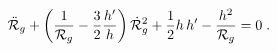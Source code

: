 \begin{equation}\label{geo}
\ddot {\cal R}_g + \left( {1 \over {\cal R}_g} - {3 \over 2}
  {{h'}\over h}\right) \dot {\cal R}_g^2 + {1\over 2} h \, h' - {h^2
  \over {\cal R}_g} = 0 \; . 
\end{equation}


